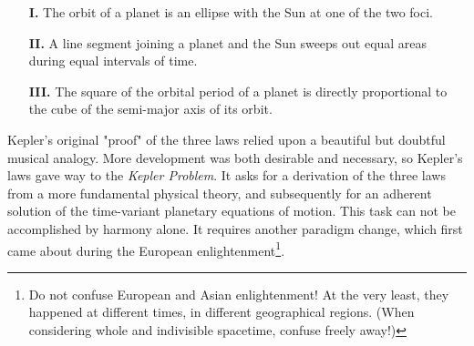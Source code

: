 \documentclass[nofootinbib,preprint]{revtex4-1}
\begin{document}
\begin{itemize}
\item[\textbf{I.} ] The orbit of a planet is an ellipse with the 
     Sun at one of the two foci.  
\item[\textbf{II.} ] A line segment joining a planet and the Sun sweeps
     out equal areas during equal intervals of time.  
\item[\textbf{III.} ] The square of the orbital period of a planet is directly
     proportional to the cube of the semi-major axis of its orbit.
\end{itemize}
Kepler's original "proof" of the three laws relied upon a beautiful but doubtful musical 
analogy. More development was both desirable and necessary, so Kepler's laws gave way to 
the \textit{Kepler Problem}. It asks for a derivation of the three laws from a more 
fundamental physical theory, and subsequently for an adherent solution of the time-variant 
planetary equations of motion. This task can not be accomplished by harmony alone. It requires 
another paradigm change, which first came about during the European enlightenment\footnote{Do not confuse 
European and Asian enlightenment! At the very least, they happened at different times, 
in different geographical regions. (When considering whole and indivisible spacetime, 
confuse freely away!)}.
\end{document}
